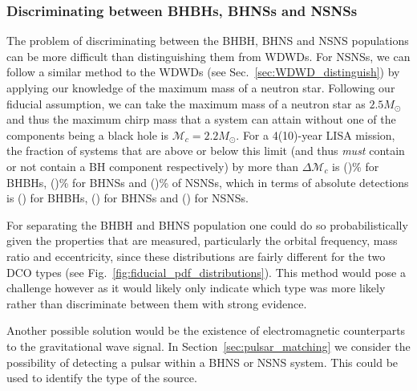 \subsubsection{Discriminating between BHBHs, BHNSs and NSNSs}

The problem of discriminating between the BHBH, BHNS and NSNS populations can be more difficult than distinguishing them from WDWDs. For NSNSs, we can follow a similar method to the WDWDs (see Sec.~\ref{sec:WDWD_distinguish}) by applying our knowledge of the maximum mass of a neutron star. Following our fiducial assumption, we can take the maximum mass of a neutron star as $2.5 \unit{M_{\odot}}$ and thus the maximum chirp mass that a system can attain without one of the components being a black hole is $\mathcal{M}_{c} = 2.2 \unit{M_\odot}$. For a 4(10)-year LISA mission, the fraction of systems that are above or below this limit (and thus \textit{must} contain or not contain a BH component respectively) by more than $\Delta \mathcal{M}_c$ is \BHBHEitherBHOrNSFourPerc{}(\BHBHEitherBHOrNSTenPerc{})\% for BHBHs, \BHNSEitherBHOrNSFourPerc{}(\BHNSEitherBHOrNSTenPerc{})\% for BHNSs and \NSNSEitherBHOrNSFourPerc{}(\NSNSEitherBHOrNSTenPerc{})\% of NSNSs, which in terms of absolute detections is \BHBHEitherBHOrNSFour{}(\BHBHEitherBHOrNSTen{}) for BHBHs, \BHNSEitherBHOrNSFour{}(\BHNSEitherBHOrNSTen{}) for BHNSs and \NSNSEitherBHOrNSFour{}(\NSNSEitherBHOrNSTen{}) for NSNSs.

For separating the BHBH and BHNS population one could do so probabilistically given the properties that are measured, particularly the orbital frequency, mass ratio and eccentricity, since these distributions are fairly different for the two DCO types (see Fig.~\ref{fig:fiducial_pdf_distributions}). This method would pose a challenge however as it would likely only indicate which type was more likely rather than discriminate between them with strong evidence.

Another possible solution would be the existence of electromagnetic counterparts to the gravitational wave signal. In Section~\ref{sec:pulsar_matching} we consider the possibility of detecting a pulsar within a BHNS or NSNS system. This could be used to identify the type of the source.

